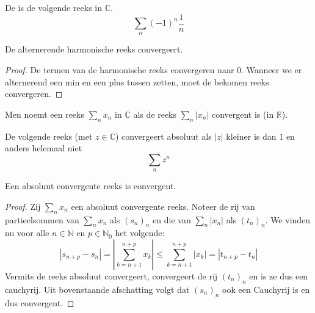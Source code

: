 \documentclass[main.tex]{subfiles}
\begin{document}
\begin{de}
  De  is de volgende reeks in $\mathbb{C}$.
  \[ \sum_{n}(-1)^{n}\frac{1}{n} \]
\end{de}

\begin{st}
  De alternerende harmonische reeks convergeert.

  \begin{proof}
    De termen van de harmonische reeks convergeren naar $0$.
    Wanneer we er alternerend een min en een plus tussen zetten, moet de bekomen reeks convergeren.
  \end{proof}
\end{st}


\begin{de}
  \label{de:absoluut-convergent}
  Men noemt een reeks $\sum_{n}x_{n}$ in $\mathbb{C}$  als de reeks $\sum_{n}|x_{n}|$ convergent is (in $\mathbb{R}$).
\end{de}

\begin{vb}
  De volgende reeks (met $z\in \mathbb{C}$) convergeert absoluut als $|z|$ kleiner is dan $1$ en anders helemaal niet
  \[ \sum_{n}z^{n} \]
\end{vb}

\begin{bpr}
  Een absoluut convergente reeks is convergent.

  \begin{proof}
    Zij $\sum_{n}x_{n}$ een absoluut convergente reeks.
    Noteer de rij van partieelsommen van $\sum_{n}x_{n}$ als $(s_{n})_{n}$ en die van $\sum_{n}|x_{n}|$ als $(t_{n})_{n}$.
    We vinden nu voor alle $n\in \mathbb{N}$ en $p\in \mathbb{N}_{0}$ het volgende:
    \[
    |s_{n+p} - s_{n}|
    = \left| \sum_{k=n+1}^{n+p}x_{k} \right|
    \le \sum_{k=n+1}^{n+p}|x_{k}|
    = |t_{n+p}-t_{n}|
    \]
    Vermits de reeks absoluut convergeert, convergeert de rij $(t_{n})_{n}$ en is ze dus een cauchyrij.
    Uit bovenstaande afschatting volgt dat $(s_{n})_{n}$ ook een Cauchyrij is en dus convergent.
  \end{proof}
\end{bpr}
\end{document}
